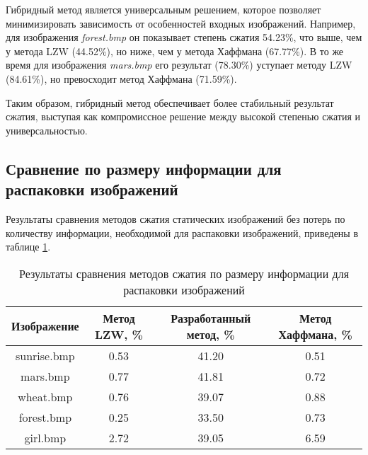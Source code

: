 Гибридный метод является универсальным решением, которое позволяет минимизировать зависимость от особенностей входных изображений. Например, для изображения \textit{forest.bmp} он показывает степень сжатия 54.23\%, что выше, чем у метода LZW (44.52\%), но ниже, чем у метода Хаффмана (67.77\%). В то же время для изображения \textit{mars.bmp} его результат (78.30\%) уступает методу LZW (84.61\%), но превосходит метод Хаффмана (71.59\%).

Таким образом, гибридный метод обеспечивает более стабильный результат сжатия, выступая как компромиссное решение между высокой степенью сжатия и универсальностью.

\subsection{Сравнение по размеру информации для \mbox{распаковки} изображений}

Результаты сравнения методов сжатия статических изображений без потерь по количеству информации, необходимой для распаковки изображений, приведены в таблице \ref{tbl:info_to_decompress}.
\captionsetup{justification=raggedleft,singlelinecheck=false}
\begin{table}[H]
    \centering
        \caption{Результаты сравнения методов сжатия по размеру информации для распаковки изображений}
        \label{tbl:info_to_decompress}
        \begin{tabular}{|c|c|c|c|}
            \hline
            \textbf{Изображение}
            & \begin{minipage}[t]{4cm}\centering\textbf{Метод LZW, \%}\end{minipage} 
            & \begin{minipage}[t]{4cm}\centering\textbf{Разработанный метод, \%}\end{minipage}
            & \begin{minipage}[t]{4cm}\centering\textbf{Метод Хаффмана, \%}\end{minipage} \\ \hline
            sunrise.bmp &  0.53  &  41.20  &  0.51  \\ \hline
            mars.bmp    &  0.77  &  41.81  &  0.72  \\ \hline
            wheat.bmp   &  0.76  &  39.07  &  0.88  \\ \hline
            forest.bmp  &  0.25  &  33.50  &  0.73  \\ \hline
            girl.bmp    &  2.72  &  39.05  &  6.59  \\ \hline
        \end{tabular}
\end{table}

